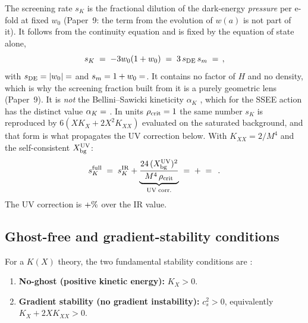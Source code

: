 \documentclass[12pt,a4paper]{article}
\newcommand{\sK}{s_K}
\newcommand{\rhoc}{\rho_{\rm crit}}
\begin{document}
The screening rate $\sK$ is the fractional dilution of the dark-energy
\emph{pressure} per e-fold at fixed $w_0$ (Paper~9: the term from the evolution
of $w(a)$ is not part of it). It follows from the continuity equation and is
fixed by the equation of state alone,
\begin{equation}
  \sK \;=\; -3w_0(1+w_0) \;=\; 3\,s_{\rm DE}\,s_m \;=\; \val{S_K_d6}\,,
  \label{eq:sKdef}
\end{equation}
with $s_{\rm DE} = |w_0| = \val{S_DE_d6}$ and $s_m = 1+w_0 = \val{S_M_d6}$. It contains
no factor of $H$ and no density, which is why the screening fraction built from
it is a purely geometric lens (Paper~9). It is \emph{not} the Bellini--Sawicki
kineticity $\alpha_K$ \citep{BelliniSawicki2014,Cheung2008,Gubitosi2013}, which
for the SSEE action has the distinct value $\alpha_K = \val{alpha_K_z0_d6}$
\citep{SSEE7}. In units $\rhoc = 1$ the same number $\sK$ is reproduced by
$6\left(X K_X + 2X^2 K_{XX}\right)$ evaluated on the saturated background, and
that form is what propagates the UV correction below.
With $K_{XX} = 2/M^4$ and the self-consistent $X_{\rm bg}^{\rm UV}$:
\begin{equation}
  \sK^{\rm full}
  \;=\; \sK^{\rm IR}
        + \underbrace{\frac{24\,(X_{\rm bg}^{\rm UV})^2}{M^4\,\rhoc}}_{\rm UV\;corr.}
  \;=\; \val{S_K_d5} + \val{sK_UV_corr}
  \;=\; \val{S_K_FULL_d5}\,.
  \label{eq:sKfullform}
\end{equation}
The UV correction is $+\val{sK_UV_pct}\%$ over the IR value.

\subsection{Ghost-free and gradient-stability conditions}
\label{subsec:stability_UV}

For a $K(X)$ theory, the two fundamental stability conditions are
\citep{Garriga1999}:
\begin{enumerate}
  \item \textbf{No-ghost (positive kinetic energy):} $K_X > 0$.
  \item \textbf{Gradient stability (no gradient instability):} $c_s^2 > 0$,
    equivalently $K_X + 2XK_{XX} > 0$.
\end{enumerate}
\end{document}

